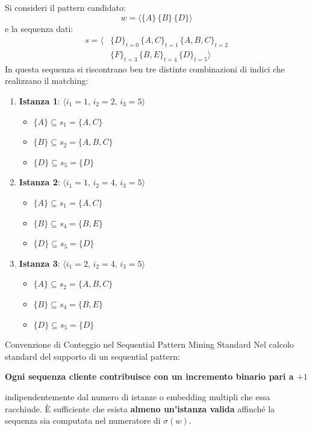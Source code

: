 \begin{example}
Si consideri il pattern candidato:
\begin{equation*}
w = \langle \{A\} \, \{B\} \, \{D\} \rangle
\end{equation*}
e la sequenza dati:
\begin{equation}
\begin{split}
s = \langle &\{D\}_{t=0} \, \{A, C\}_{t=1} \, \{A, B, C\}_{t=2} \\
&\{F\}_{t=3} \, \{B, E\}_{t=4} \, \{D\}_{t=5} \rangle
\end{split}
\end{equation}
In questa sequenza si riscontrano ben tre distinte combinazioni di indici che realizzano il matching:
\begin{enumerate}
    \item \textbf{Istanza 1}: $\langle i_1 = 1, \, i_2 = 2, \, i_3 = 5 \rangle$
    \begin{itemize}[noitemsep]
        \item $\{A\} \subseteq s_1 = \{A, C\}$
        \item $\{B\} \subseteq s_2 = \{A, B, C\}$
        \item $\{D\} \subseteq s_5 = \{D\}$
    \end{itemize}
    \item \textbf{Istanza 2}: $\langle i_1 = 1, \, i_2 = 4, \, i_3 = 5 \rangle$
    \begin{itemize}[noitemsep]
        \item $\{A\} \subseteq s_1 = \{A, C\}$
        \item $\{B\} \subseteq s_4 = \{B, E\}$
        \item $\{D\} \subseteq s_5 = \{D\}$
    \end{itemize}
    \item \textbf{Istanza 3}: $\langle i_1 = 2, \, i_2 = 4, \, i_3 = 5 \rangle$
    \begin{itemize}[noitemsep]
        \item $\{A\} \subseteq s_2 = \{A, B, C\}$
        \item $\{B\} \subseteq s_4 = \{B, E\}$
        \item $\{D\} \subseteq s_5 = \{D\}$
    \end{itemize}
\end{enumerate}
\end{example}

\begin{alertblock}{Convenzione di Conteggio nel Sequential Pattern Mining Standard}
    Nel calcolo standard del supporto di un sequential pattern:
    \begin{center}
    \textbf{Ogni sequenza cliente contribuisce con un incremento binario pari a $+1$}
    \end{center}
    indipendentemente dal numero di istanze o embedding multipli che essa racchiude. È sufficiente che esista \textbf{almeno un'istanza valida} affinché la sequenza sia computata nel numeratore di $\sigma(w)$.
\end{alertblock}

\FloatBarrier
